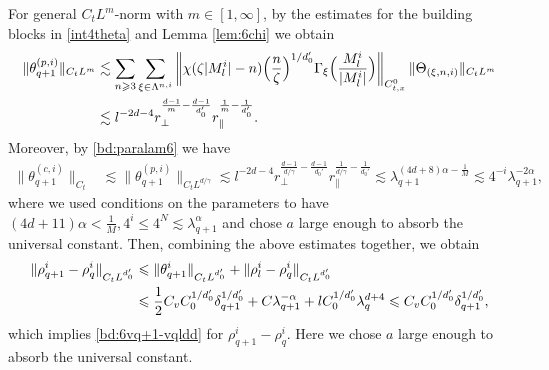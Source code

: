 \documentclass[10pt,a4paper]{amsart}
\numberwithin{equation}{section}
\def\({{\Big(}}
\def\){{\Big)}}
\newcommand{\norm}[1]{\left\|#1\right\|}
\def\geq{\geqslant}
\def\leq{\leqslant}
\def\({{\Big(}}
\def\){{\Big)}}
\def\geq{\geqslant}
\def\leq{\leqslant}
\begin{document}
For general $C_tL^m$-norm with $m\in[1,\infty]$, by the estimates for the building blocks in \eqref{int4theta}  and Lemma \ref{lem:6chi} we obtain
\begin{align}
\|\theta_{q+1}^{(p,i)} \|_{C_tL^{m}}&\lesssim\sum_{n\geq3}\sum_{\xi\in\Lambda^{n,i}}\norm{\chi(\zeta|M^{i}_l|-n)\(\frac{n}{\zeta}\)^{1/d_0'}\Gamma_{\xi}\(\frac{M^{i}_l}{|M^{i}_l|}\)}_{C_{t,x}^0}\|\Theta_{(\xi,n,i)} \|_{C_tL^{m}}\notag\\ 
&\lesssim l^{-2d-4}r_\perp^{\frac{d-1}{m}-\frac{d-1}{d_0'}} r_\parallel^{\frac{1}{m}-\frac{1}{d_0'}}.\label{bd:6theq+1plp}
\end{align}
Moreover, by   \eqref{bd:paralam6} we have
\begin{align}
\|\theta_{q+1}^{(c,i)} \|_{C_t}&\lesssim\|\theta_{q+1}^{(p,i)} \|_{C_tL^{d/\gamma}}
\lesssim l^{-2d-4}r_\perp^{\frac{d-1}{d/\gamma}-\frac{d-1}{d_0'}} r_\parallel^{\frac1{d/\gamma}-\frac{1}{d_0'}}\lesssim  \lambda_{q+1}^{(4d+8)\alpha-\frac1M}\lesssim4^{-i} \lambda_{q+1}^{-2\alpha},\label{bd:6theq+1clp}
\end{align}
where we used  conditions on the parameters to have $(4d+11)\alpha<\frac1{M},4^i\leq4^{N}\lesssim\lambda_{q+1}^{\alpha}$ and chose $a$ large enough to absorb the universal constant.
Then, combining the above estimates together, we obtain
\begin{align}
\|\rho^{i}_{q+1}-\rho^{i}_q\|_{C_tL^{d_0'}}
&\leq\|\theta^{i}_{q+1}\|_{C_tL^{d_0'}}+\|\rho^{i}_{l}-\rho^{i}_q\|_{C_tL^{d_0'}}\notag\\
&\leq\frac12 C_v C_0^{1/{d_0'}} \delta_{q+1}^{1/{d_0'}}+C\lambda_{q+1}^{-\alpha}+lC_0^{1/{d_0'}}\lambda_q^{d+4}\leq C_v C_0^{1/{d_0'}}\delta_{q+1}^{1/{d_0'}},\notag
\end{align}
which implies \eqref{bd:6vq+1-vqldd} for $\rho^{i}_{q+1}-\rho_q^i$. Here we chose $a$ large enough to absorb the universal constant.  
\end{document}
